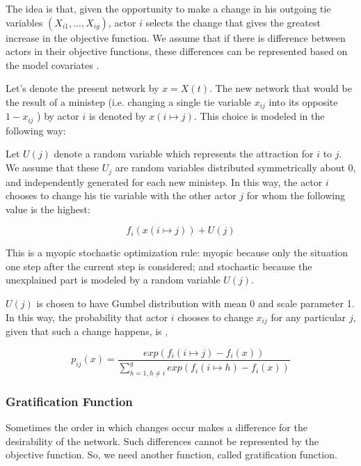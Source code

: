\documentclass[11pt]{report}
\begin{document}
The idea is that, given the opportunity to make a change in his outgoing tie variables $(X_{i1},...,X_{ig})$, actor $i$ selects the change that gives the greatest increase in the objective function. We assume that if there is difference between actors in their objective functions, these differences can be represented based on the model covariates \cite{Snijders2004}. 

Let's denote the present network by $x = X(t)$. The new network that would be the result of a ministep (i.e. changing a single tie variable $x_{ij}$ into its opposite $1 - x_{ij}$ ) by actor $i$ is denoted by $x(i \mapsto j)$. This choice is modeled in the following way: 

Let $U(j)$ denote a random variable which represents the attraction for $i$ to $j$. We assume that these $U_j$ are random variables distributed symmetrically about 0, and independently generated for each new ministep. In this way, the actor $i$ chooses to change his tie variable with the other actor $j$ for whom the following value \cite{Snijders2004} is the highest:

\begin{equation}
f_i(x(i \mapsto j)) + U(j)
\end{equation} 

This is a myopic stochastic optimization rule: myopic because only the situation one step after the current step is considered; and stochastic because the unexplained part is modeled by a random variable $U(j)$. 

$U(j)$ is chosen to have Gumbel distribution with mean 0 and scale parameter 1. In this way, the probability that actor $i$ chooses to change $x_{ij}$ for any particular $j$, given that such a change happens, is \cite{Snijders2004},

\begin{equation}
p_{ij}(x) = \frac{exp(f_i(i \mapsto j) - f_i(x))}{\sum_{h=1, h \neq i}^{g} exp(f_i(i \mapsto h) - f_i(x))}
\end{equation}

\subsubsection{Gratification Function}
Sometimes the order in which changes occur makes a difference for the desirability of the network. Such differences cannot be represented by the objective function. So, we need another function, called gratification function. \\
\end{document}
